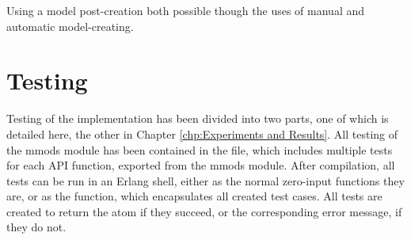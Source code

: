 Using a model post-creation both possible though the uses of manual and automatic model-creating. 
\section{Testing}
Testing of the implementation has been divided into two parts, one of which is detailed here, the other in Chapter \ref{chp:Experiments and Results}. All testing of the mmods module has been contained in the  file, which includes multiple tests for each API function, exported from the mmods module. After compilation, all tests can be run in an Erlang shell, either as the normal zero-input functions they are, or as the  function, which encapsulates all created test cases. All tests are created to return the atom  if they succeed, or the corresponding error message, if they do not.

